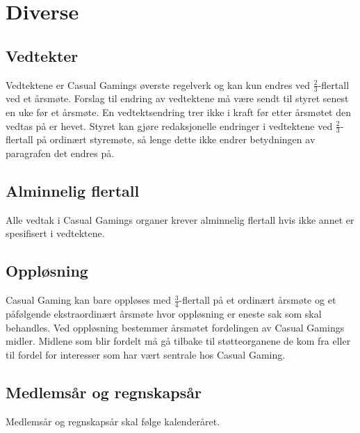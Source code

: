 \chapter{Diverse}

\section{Vedtekter}
Vedtektene er Casual Gamings øverste regelverk og kan kun endres ved $\frac{2}{3}$-flertall ved et årsmøte. Forslag til endring av vedtektene må være sendt til styret senest en uke før et årsmøte. En vedtektsendring trer ikke i kraft før etter årsmøtet den vedtas på er hevet. Styret kan gjøre redaksjonelle endringer i vedtektene ved $\frac{2}{3}$-flertall på ordinært styremøte, så lenge dette ikke endrer betydningen av paragrafen det endres på.

\section{Alminnelig flertall}
Alle vedtak i Casual Gamings organer krever alminnelig flertall hvis ikke annet er spesifisert i vedtektene.

\section{Oppløsning}
Casual Gaming kan bare oppløses med $\frac{3}{4}$-flertall på et ordinært årsmøte og et påfølgende ekstraordinært årsmøte hvor oppløsning er eneste sak som skal behandles. Ved oppløsning bestemmer årsmøtet fordelingen av Casual Gamings midler. Midlene som blir fordelt må gå tilbake til støtteorganene de kom fra eller til fordel for interesser som har vært sentrale hos Casual Gaming.

\section{Medlemsår og regnskapsår}
Medlemsår og regnskapsår skal følge kalenderåret.
